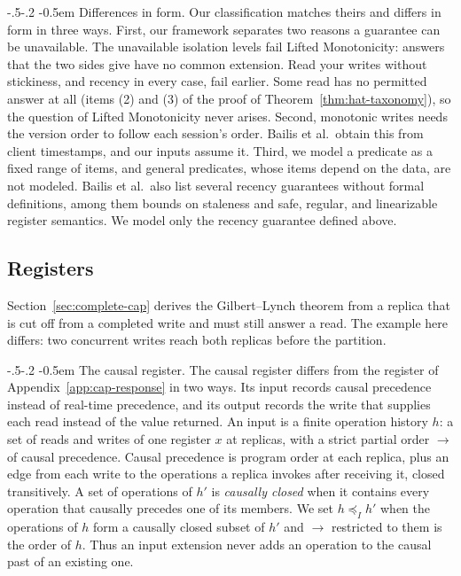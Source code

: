 \documentclass[sigconf]{cidr-2027}
\makeatletter
\theoremstyle{remark}
\renewcommand\paragraph{\@startsection{paragraph}{4}{\z@}%
  {-.5\baselineskip \@plus -2\p@ \@minus -.2\p@}%
  {-0.5em}%
  {\normalfont\bfseries}}
\newcommand{\InputOrd}{\preceq_I}
\newcommand{\indesc}{input extension\xspace} %
\makeatother
\begin{document}
\paragraph{Differences in form.}
Our classification matches theirs and differs in form in three ways. First, our framework separates two reasons a guarantee can be unavailable. The unavailable isolation levels fail Lifted Monotonicity: answers that the two
sides give have no common extension. Read your writes without stickiness, and
recency in every case, fail earlier. Some read has no permitted answer at all
(items (2) and (3) of the proof of Theorem~\ref{thm:hat-taxonomy}), so the
question of Lifted Monotonicity never arises. Second, monotonic writes needs
the version order to follow each session's order. Bailis et al.\ obtain this
from client timestamps, and our inputs assume it. Third, we model a predicate
as a fixed range of items, and general predicates, whose items depend on the
data, are not modeled. Bailis et al.\ also list several recency guarantees
without formal definitions, among them bounds on staleness and safe, regular,
and linearizable register semantics. We model only the recency guarantee
defined above.

\subsection{Registers}
\label{app:registers}

Section~\ref{sec:complete-cap} derives the Gilbert--Lynch theorem from a
replica that is cut off from a completed write and must still answer a read. The example here differs: two concurrent writes reach both replicas before the
partition.

\paragraph{The causal register.}
The causal register differs from the register of
Appendix~\ref{app:cap-response} in two ways. Its input records causal
precedence instead of real-time precedence, and its output records the write
that supplies each read instead of the value returned. An input is a finite operation history $h$: a set of reads and writes of one
register $x$ at replicas, with a strict partial order $\to$ of causal
precedence. Causal precedence is program order at each replica, plus an edge
from each write to the operations a replica invokes after receiving it,
closed transitively. A set of operations of $h'$ is \emph{causally closed}
when it contains every operation that causally precedes one of its members. We set $h\InputOrd h'$ when the operations of $h$ form a causally closed
subset of $h'$ and $\to$ restricted to them is the order of $h$. Thus an
\indesc never adds an operation to the causal past of an existing one.
\end{document}
